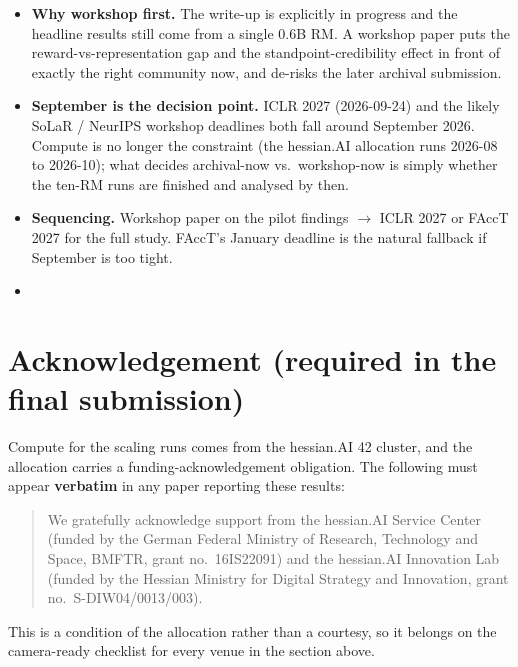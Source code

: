 \documentclass{article}
\begin{document}
\begin{itemize}
  \item \textbf{Why workshop first.} The write-up is explicitly in progress and the headline results still
        come from a single 0.6B RM. A workshop paper puts the reward-vs-representation gap and the
        standpoint-credibility effect in front of exactly the right community now, and de-risks the later
        archival submission.
  \item \textbf{September is the decision point.} ICLR 2027 (2026-09-24) and the likely SoLaR / NeurIPS
        workshop deadlines both fall around September 2026. Compute is no longer the constraint (the
        hessian.AI allocation runs 2026-08 to 2026-10); what decides archival-now vs.\ workshop-now is
        simply whether the ten-RM runs are finished and analysed by then.
  \item \textbf{Sequencing.} Workshop paper on the pilot findings $\rightarrow$ ICLR 2027 or FAccT 2027 for
        the full study. FAccT's January deadline is the natural fallback if September is too tight.
  \item {}
\end{itemize}

\section{Acknowledgement (required in the final submission)}
Compute for the scaling runs comes from the hessian.AI 42 cluster, and the allocation carries a
funding-acknowledgement obligation. The following must appear \textbf{verbatim} in any paper reporting these
results:

\begin{quote}
We gratefully acknowledge support from the hessian.AI Service Center (funded by the German Federal Ministry
of Research, Technology and Space, BMFTR, grant no.\ 16IS22091) and the hessian.AI Innovation Lab (funded by
the Hessian Ministry for Digital Strategy and Innovation, grant no.\ S-DIW04/0013/003).
\end{quote}

\noindent This is a condition of the allocation rather than a courtesy, so it belongs on the camera-ready
checklist for every venue in the section above.
\end{document}
